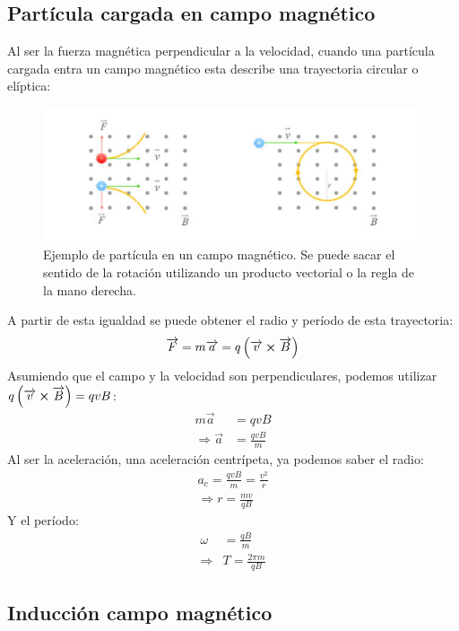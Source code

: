 \documentclass[arial,a4paper,print]{article}
\begin{document}
\subsection{Partícula cargada en campo magnético}
Al ser la fuerza magnética perpendicular a la velocidad, cuando una partícula cargada entra un campo magnético esta describe una trayectoria circular o elíptica: 

\begin{figure}[H]
	\centering
	\includegraphics[width=0.7\linewidth]{figures/particula_con_B}
	\caption{Ejemplo de partícula en un campo magnético. Se puede sacar el sentido de la rotación utilizando un producto vectorial o la regla de la mano derecha. }
	\label{fig:particulaconb}
\end{figure}

A partir de esta igualdad se puede obtener el radio y período de esta trayectoria:
\begin{align*}
	\overrightarrow{F} = m\overrightarrow{a} &= q\left(\overrightarrow{v}\cross\overrightarrow{B}\right)  \\
\end{align*}
Asumiendo que el campo y la velocidad son perpendiculares, podemos utilizar $q\left(\overrightarrow{v}\cross\overrightarrow{B}\right) = qvB$:
\begin{align*}
	m\overrightarrow{a} &= qvB \\
	\Rightarrow \overrightarrow{a} &= \frac{qvB}{m}
\end{align*}
Al ser la aceleración, una aceleración centrípeta, ya podemos saber el radio:
\begin{align*}
	a_{c} = \frac{qvB}{m} = \frac{v^{2}}{r} \\
	\Rightarrow r = \frac{mv}{qB}
\end{align*}
Y el período:
\begin{align*}
	\omega &= \frac{qB}{m} \\
	\Rightarrow & T = \frac{2\pi m}{qB}
\end{align*}

\subsection{Inducción campo magnético}
\end{document}
